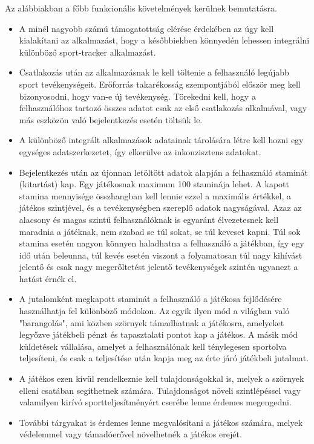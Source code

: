 Az alábbiakban a főbb funkcionális követelmények kerülnek bemutatásra. 

\begin{itemize}
	\item 
	A minél nagyobb számú támogatottság elérése érdekében az úgy kell kialakítani az alkalmazást, hogy a későbbiekben könnyedén lehessen integrálni különböző sport-tracker alkalmazást. 
	\item 
	Csatlakozás után az alkalmazásnak le kell töltenie a felhasználó legújabb sport tevékenységeit. 
	Erőforrás takarékosság szempontjából először meg kell bizonyosodni, hogy van-e új tevékenység. 
	Törekedni kell, hogy a felhasználóhoz tartozó összes adatot csak az első csatlakozás alkalmával, vagy más eszközön való bejelentkezés esetén töltsük le. 
	\item
	A különböző integrált alkalmazások adatainak tárolására létre kell hozni egy egységes adatszerkezetet, így elkerülve az inkonzisztens adatokat. 
	\item 
	Bejelentkezés után az újonnan letöltött adatok alapján a felhasználó staminát (kitartást) kap. 
	Egy játékosnak maximum 100 staminája lehet. 
	A kapott stamina mennyisége összhangban kell lennie ezzel a maximális értékkel, a játékos szintjével, és a tevékenységben szereplő adatok nagyságával. 
	Azaz az alacsony és magas szintű felhasználóknak is egyaránt élvezetesnek kell maradnia a játéknak, nem szabad se túl sokat, se túl keveset kapni. 
	Túl sok stamina esetén nagyon könnyen haladhatna a felhasználó a játékban, így egy idő után beleunna, túl kevés esetén viszont a folyamatosan túl nagy kihívást jelentő és csak nagy megerőltetést jelentő tevékenységek szintén ugyanezt a hatást érnék el.
	\item 
	A jutalomként megkapott staminát a felhasználó a játékosa fejlődésére használhatja fel különböző módokon. 
	Az egyik ilyen mód a világban való "barangolás", ami közben szörnyek támadhatnak a játékosra, amelyeket legyőzve játékbeli pénzt és tapasztalati pontot kap a játékos. 
	A másik mód küldetések vállalása, amelyet a felhasználónak kell ténylegesen sportolva teljesíteni, és csak a teljesítése után kapja meg az érte járó játékbeli jutalmat.
	\item 
	A játékos ezen kívül rendelkeznie kell tulajdonságokkal is, melyek a szörnyek elleni csatában segíthetnek számára. 
	Tulajdonságot növeli szintlépéssel vagy valamilyen kirívó sportteljesítményért cserébe lenne érdemes megengedni.
	\item 
	További tárgyakat is érdemes lenne megvalósítani a játékos számára, melyek védelemmel vagy támadóerővel növelhetnék a játékos erejét.
\end{itemize}


